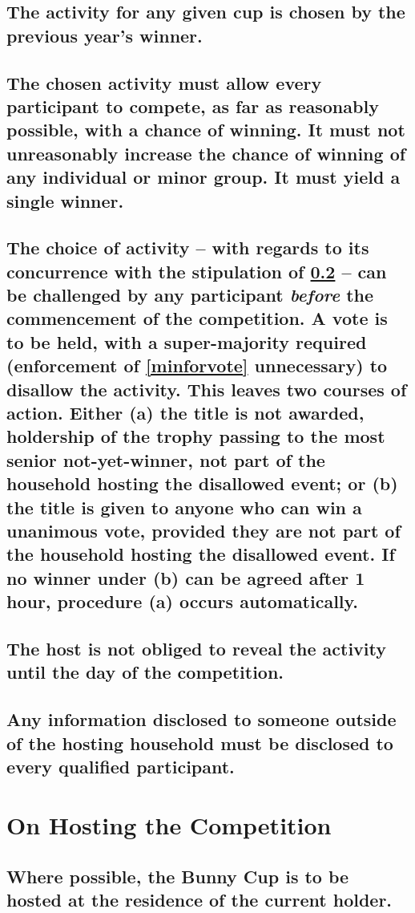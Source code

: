 \documentclass[a4paper]{article}
\begin{document}
\subsection{The activity for any given cup is chosen by the previous year's winner.}
\subsection{The chosen activity must allow every participant to compete, as far as reasonably possible, with a chance of winning. It must not unreasonably increase the chance of winning of any individual or minor group. It must yield a single winner.}\label{choiceofact}

\subsection{The choice of activity – with regards to its concurrence with the stipulation of \ref{choiceofact} – can be challenged by any participant \emph{before} the commencement of the competition. A vote is to be held, with a super-majority required (enforcement of \ref{minforvote} unnecessary) to disallow the activity.  This leaves two courses of action. Either (a) the title is not awarded, holdership of the trophy passing to the most senior not-yet-winner, not part of the household hosting the disallowed event; or (b) the title is given to anyone who can win a unanimous vote, provided they are not part of the household hosting the disallowed event. If no winner under (b) can be agreed after 1 hour, procedure (a) occurs automatically.}\label{choiceofactdispute}

\subsection{The host is not obliged to reveal the activity until the day of the competition.}
\subsection{Any information disclosed to someone outside of the hosting household must be disclosed to every qualified participant.}



\section{On Hosting the Competition}
\subsection{Where possible, the Bunny Cup is to be hosted at the residence of the current holder.}\label{currentholder}
\end{document}
